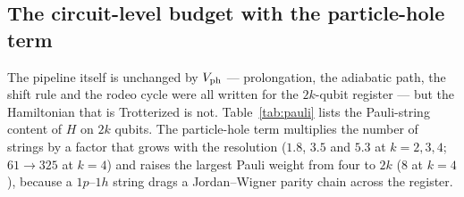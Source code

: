\documentclass[
  aps,            %
  prc,            %
  reprint,        %
  superscriptaddress,
  floatfix,
  nofootinbib
]{revtex4-2}
\begin{document}
\subsection{The circuit-level budget with the particle-hole term}
\label{sec:ph-cost}
The pipeline itself is unchanged by $V_{\rm ph}$ --- prolongation, the adiabatic
path, the shift rule and the rodeo cycle were all written for the $2k$-qubit
register --- but the Hamiltonian that is Trotterized is not.
Table~\ref{tab:pauli} lists the Pauli-string content of $H$ on $2k$ qubits.
The particle-hole term multiplies the number of strings by a factor that
grows with the resolution ($1.8$, $3.5$ and $5.3$ at $k=2,3,4$; $61\to325$ at
$k=4$) and raises the largest Pauli weight from four to $2k$ ($8$ at $k=4$),
because a $1p$--$1h$ string drags a Jordan--Wigner parity chain across the
register.
\end{document}
